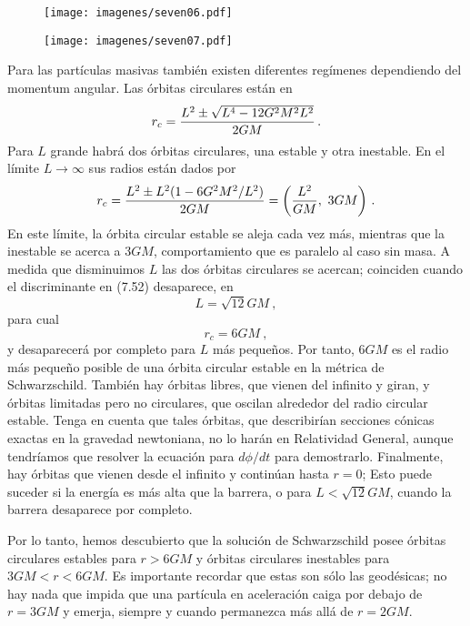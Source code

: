 \documentclass[11pt,b5paper,openany,twoside]{book}
\begin{document}
\begin{figure}[h]
\centering
\texttt{[image: imagenes/seven06.pdf]}
\end{figure}

\begin{figure}[h]
\centering
\texttt{[image: imagenes/seven07.pdf]}
\end{figure}

Para las partículas masivas también existen diferentes regímenes dependiendo del momentum angular.
Las órbitas circulares están en
\begin{equation}
r_c = {{L^2\pm \sqrt{L^4 - 12 G^2 M^2 L^2}}\over{2GM}}\,.\label{7.52}
\end{equation}
Para $L$ grande habrá dos órbitas circulares, una estable y otra inestable.
En el límite $L\rightarrow\infty$ sus radios están dados por
\begin{equation}
r_c = {{L^2\pm L^2(1 - 6 G^2 M^2/L^2)}\over{2GM}} =
\left({{L^2}\over{GM}} ,\ 3GM\right)\,.\label{7.53}
\end{equation}
En este límite, la órbita circular estable se aleja cada vez más, mientras que la inestable se acerca a $3GM$, comportamiento que es paralelo al caso sin masa.
A medida que disminuimos $L$ las dos órbitas circulares se acercan; coinciden cuando el discriminante en (7.52) desaparece, en
\begin{equation}
L = \sqrt{12}GM\ ,\label{7.54}
\end{equation}
para cual
\begin{equation}
r_c = 6GM\ ,\label{7.55}
\end{equation}
y desaparecerá por completo para $L$ más pequeños.
Por tanto, $6GM$ es el radio más pequeño posible de una órbita circular estable en la métrica de Schwarzschild.
También hay órbitas libres, que vienen del infinito y giran, y órbitas limitadas pero no circulares, que oscilan alrededor del radio circular estable.
Tenga en cuenta que tales órbitas, que describirían secciones cónicas exactas en la gravedad newtoniana, no lo harán en Relatividad General, aunque tendríamos que resolver la ecuación para $d\phi/dt$ para demostrarlo.
Finalmente, hay órbitas que vienen desde el infinito y continúan hasta $r=0$; Esto puede suceder si la energía es más alta que la barrera, o para $L<\sqrt{12}GM$, cuando la barrera desaparece por completo.

Por lo tanto, hemos descubierto que la solución de Schwarzschild posee órbitas circulares estables para $r>6GM$ y órbitas circulares inestables para $3GM < r < 6GM$.
Es importante recordar que estas son sólo las geodésicas; no hay nada que impida que una partícula en aceleración caiga por debajo de $r=3GM$ y emerja, siempre y cuando permanezca más allá de $r=2GM$.
\end{document}
